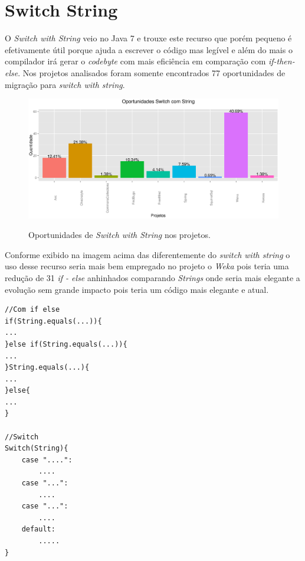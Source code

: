 \section{Switch String}

O \textit{Switch with String} veio no Java 7 e trouxe este recurso que porém pequeno é efetivamente útil porque ajuda a escrever o código mas legível e além do mais o compilador 
irá gerar o \textit{codebyte} com mais eficiência em comparação com \textit{if-then-else}. Nos projetos analisados foram somente encontrados 77 oportunidades de migração para \textit{switch with string}.

\begin{figure}[h]
	\center
	\includegraphics[scale=0.5]{Imagens/oportunidadesSwitchString}
	\label{fig:Switch with String}
	\caption{Oportunidades de \textit{Switch with String} nos projetos.}
\end{figure}

Conforme exibido na imagem acima das diferentemente do \textit{switch with string} o uso desse recurso seria mais bem empregado no projeto o \textit{Weka} pois teria uma redução de 31 \textit{if - else} anhinhados comparando \textit{Strings} onde seria mais elegante a evolução sem grande impacto pois teria um código mais elegante e atual.

\begin{lstlisting}
//Com if else
if(String.equals(...)){
...
}else if(String.equals(...)){
...
}String.equals(...){
...
}else{
...
}

//Switch
Switch(String){
	case "....":
		....
	case "...":
		....
	case "...":
		....
	default:
		.....
}
\end{lstlisting}